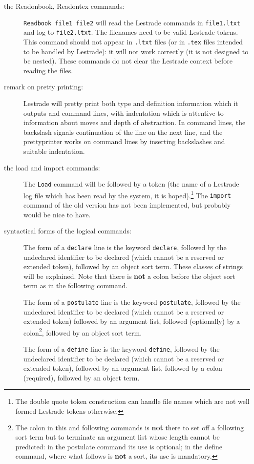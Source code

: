 \documentclass[12pt]{article}
\begin{document}
\begin{description}
\item[the Readonbook, Readontex commands:]  {\tt Readbook  file1 file2}  will read the Lestrade commands in {\tt file1.ltxt} and log to {\tt file2.ltxt}.  The filenames need to be valid Lestrade tokens.  This command should not appear in {\tt .ltxt} files (or in {\tt .tex} files intended to be handled by Lestrade):  it will not work correctly (it is not designed to be nested).  These commands do not clear the Lestrade context before reading the files.

\item[remark on pretty printing:]  Lestrade will pretty print both type and definition information which it outputs
and command lines, with indentation which is attentive to information about moves and depth of abstraction.    In command lines, the backslash signals continuation of the line on the next line, and the prettyprinter works on command lines by inserting backslashes and suitable indentation.

\item[the load and import commands:]  The {\tt Load} command will be followed by a token (the name of a Lestrade log file which has been read by the system, it is hoped).\footnote{The double quote token construction can handle file names which are not well formed Lestrade tokens otherwise.}  The {\tt import} command of the old version has not been implemented, but probably would be nice to have.

\item[syntactical forms of the logical commands:]  The form of a {\tt declare} line is the keyword {\tt declare}, followed by the undeclared identifier to be declared (which cannot be a reserved or extended token), 
followed by an object sort term.   These classes of strings will be explained.  Note that there is {\bf not} a colon before the object sort term as in the following command.

The form of a {\tt postulate} line is the keyword {\tt postulate}, followed by the undeclared identifier to be declared (which cannot be a reserved or extended token) followed by an argument list,
followed (optionally) by a colon\footnote{The colon in this and following commands is {\bf not} there to set off a following sort term but to terminate an argument list whose length cannot be predicted:  in the postulate command its use is optional;  in the define command, where what follows is {\bf not} a sort, its use is mandatory.}, followed by an object sort term.

The form of a {\tt define} line is the keyword {\tt define}, followed by the undeclared identifier to be declared (which cannot be a reserved or extended token), followed by an argument list,
followed by a colon (required), followed by an object term.


\end{description}
\end{document}
